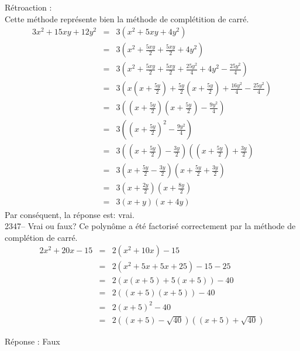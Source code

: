 \documentclass[letterpaper, 12pt]{article}
\begin{document}
R\'etroaction :\\
Cette m\'ethode repr\'esente bien la m\'ethode de compl\'etition de carr\'e.
\begin{eqnarray*}
3x^{2}+15xy+12y^{2}&=&3(x^{2}+5xy+4y^{2})\\[2mm]
&=&3\left(x^{2}+\frac{5xy}{2}+\frac{5xy}{2}+4y^{2}\right)\\[2mm]
&=&3\left(x^{2}+\frac{5xy}{2}+\frac{5xy}{2}+\frac{25y^{2}}{4}+4y^{2}-\frac{25y^{2}}{4}\right)\\[2mm]
&=&3\left(x\left(x+\frac{5y}{2}\right)+\frac{5y}{2}\left(x+\frac{5y}{2}\right)+ \frac{16y^{2}}{4}-\frac{25y^{2}}{4}\right)\\[2mm]
&=&3\left(\left(x+\frac{5y}{2}\right)\left(x+\frac{5y}{2}\right)-\frac{9y^{2}}{4}\right)\\[2mm]
&=&3\left(\left(x+\frac{5y}{2}\right)^{2}-\frac{9y^{2}}{4}\right)\\[2mm]
&=&3\left(\left(x+\frac{5y}{2}\right)-\frac{3y}{2}\right) \left(\left(x+\frac{5y}{2}\right)+\frac{3y}{2}\right)\\[2mm]
&=&3\left(x+\frac{5y}{2}-\frac{3y}{2}\right) \left(x+\frac{5y}{2}+\frac{3y}{2}\right)\\[2mm]
&=&3\left(x+\frac{2y}{2}\right) \left(x+\frac{8y}{2}\right)\\[2mm]
&=&3\left(x+y\right) \left(x+4y\right)
\end{eqnarray*}
Par cons\'equent, la r\'eponse est: vrai.\\

2347-- Vrai ou faux? Ce polyn\^ome a \'et\'e factoris\'e correctement par la m\'ethode de compl\'etion de carr\'e.
\begin{eqnarray*}
2x^{2}+20x-15 &=& 2(x^{2}+10x)-15  \\
&=& 2(x^{2}+5x+5x+25)-15-25\\
&=& 2(x(x+5)+5(x+5))-40\\
&=& 2((x+5)(x+5))-40\\
&=& 2(x+5)^{2}-40\\
&=& 2((x+5)-\sqrt{40})((x+5)+\sqrt{40})
\end{eqnarray*}

R\'eponse : Faux\\
\end{document}
